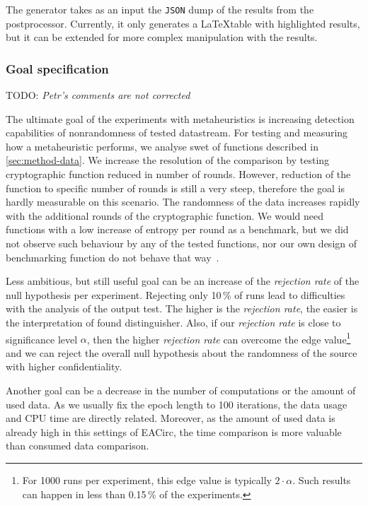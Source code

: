 \documentclass[
  print, %
  Table,   %
  nolof,     %
  nolot,     %
  11pt, %
  oneside  %
]{fithesis3}
\newcommand{\todo}[1]{TODO: \textit{#1}}
\begin{document}
The generator takes as an input the \texttt{JSON} dump of the results from the postprocessor. Currently, it only generates a \LaTeX table with highlighted results, but it can be extended for more complex manipulation with the results.

\subsubsection{\textbf{Goal specification}}
\label{subsubsec:method-spec-ss-goal}

\todo{Petr's comments are not corrected}

The ultimate goal of the experiments with metaheuristics is increasing detection capabilities of nonrandomness of tested datastream. For testing and measuring how a metaheuristic performs, we analyse swet of functions described in \cref{sec:method-data}. We increase the resolution of the comparison by testing cryptographic function reduced in number of rounds. However, reduction of the function to specific number of rounds is still a very steep, therefore the goal is hardly measurable on this scenario. The randomness of the data increases rapidly with the additional rounds of the cryptographic function. We would need functions with a low increase of entropy per round as a benchmark, but we did not observe such behaviour by any of the tested functions, nor our own design of benchmarking function do not behave that way~\cite{EACirc-lut}.

Less ambitious, but still useful goal can be an increase of the \textit{rejection rate} of the null hypothesis per experiment. Rejecting only 10\,\% of runs lead to difficulties with the analysis of the output test. The higher is the \textit{rejection rate}, the easier is the interpretation of found distinguisher. Also, if our \textit{rejection rate} is close to significance level $\alpha$, then the higher \textit{rejection rate} can overcome the edge value\footnote{For 1000 runs per experiment, this edge value is typically $2\cdot\alpha$. Such results can happen in less than 0.15\,\% of the experiments.} and we can reject the overall null hypothesis about the randomness of the source with higher confidentiality.

Another goal can be a decrease in the number of computations or the amount of used data. As we usually fix the epoch length to 100 iterations, the data usage and CPU time are directly related. Moreover, as the amount of used data is already high in this settings of EACirc, the time comparison is more valuable than consumed data comparison.
\end{document}
